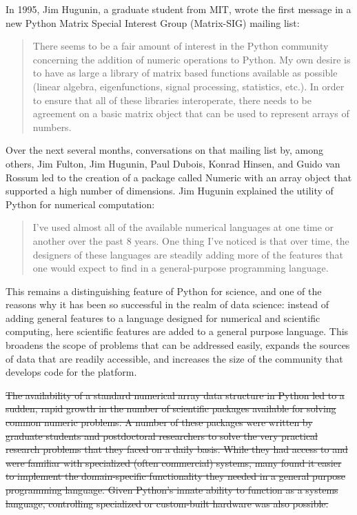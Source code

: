 \documentclass[fleqn,10pt]{wlscirep}
\providecommand{\DIFdel}[1]{{\protect\color{red}\sout{#1}}}                      %
\providecommand{\DIFdelbegin}{} %
\begin{document}
In 1995, Jim Hugunin, a graduate student from MIT, wrote the first
message in a new Python Matrix Special Interest Group (Matrix-SIG)
mailing list\cite{Hugunin-first}:
\begin{quote}
There seems to be a fair amount of interest in the Python community
concerning the addition of numeric operations to Python.  My own desire is
to have as large a library of matrix based functions available as possible
(linear algebra, eigenfunctions, signal processing, statistics, etc.).  In
order to ensure that all of these libraries interoperate, there needs to
be agreement on a basic matrix object that can be used to represent arrays
of numbers.
\end{quote}
Over the next several months, conversations on that mailing
list by, among others, Jim Fulton, Jim Hugunin, Paul Dubois, Konrad
Hinsen, and Guido van Rossum led to the creation of a package called Numeric with an array object
that supported a high number of dimensions.  Jim Hugunin explained the utility
of Python for numerical computation\cite{Hugunin-whitepaper}:
\begin{quote}
I've used almost all of the available numerical languages at one time
or another over the past 8 years. One thing I've noticed is that over
time, the designers of these languages are steadily adding more of the
features that one would expect to find in a general-purpose
programming language.
\end{quote}
This remains a distinguishing feature of Python for science, and one of the
reasons why it has been so successful in the realm of data science: instead of
adding general features to a language designed for numerical and scientific
computing, here scientific features are added to a general purpose language.
This broadens the scope of problems that can be addressed easily, expands the
sources of data that are readily accessible, and increases the size of the
community that develops code for the platform.






\DIFdelbegin \DIFdel{The availability of a standard numerical array data structure in
Python led to a sudden, rapid growth in the number of scientific
packages available for solving common numeric problems.
A number of these packages were written by graduate students and
postdoctoral researchers to solve the very practical research problems
that they faced on a daily basis.  While they had access to and were
familiar with specialized (often commercial) systems, many found
it easier to implement the domain-specific functionality they needed
in a general purpose programming language.  Given Python's innate
ability to function as a systems language, controlling specialized or
custom-built hardware was also possible.
}%
\end{document}
